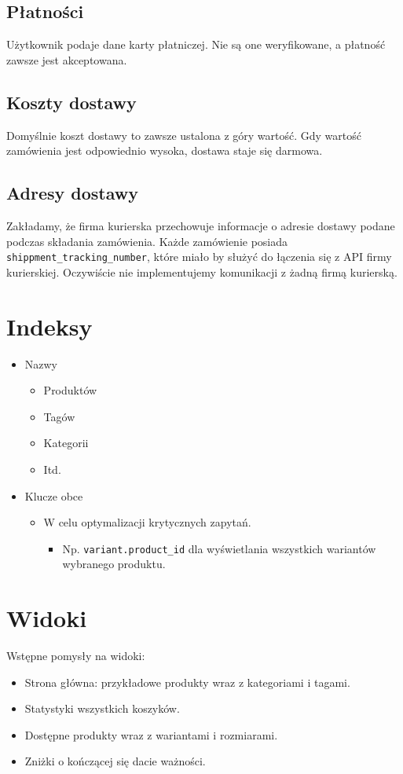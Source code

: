 \subsection*{Płatności}
Użytkownik podaje dane karty płatniczej. Nie są one weryfikowane, a płatność zawsze jest akceptowana.

\subsection*{Koszty dostawy}
Domyślnie koszt dostawy to zawsze ustalona z góry wartość. Gdy wartość zamówienia jest odpowiednio wysoka, dostawa staje się darmowa.

\subsection*{Adresy dostawy}
Zakładamy, że firma kurierska przechowuje informacje o adresie dostawy podane podczas składania zamówienia. Każde zamówienie posiada \texttt{shippment\_tracking\_number}, które miało by służyć do łączenia się z API firmy kurierskiej. Oczywiście nie implementujemy komunikacji z żadną firmą kurierską.

\section*{Indeksy}
\begin{itemize}
    \item Nazwy
        \begin{itemize}
            \item Produktów
            \item Tagów
            \item Kategorii
            \item Itd.
        \end{itemize}
    \item Klucze obce
        \begin{itemize}
            \item W celu optymalizacji krytycznych zapytań.
                    \begin{itemize}
                        \item Np. \texttt{variant.product\_id} dla wyświetlania wszystkich wariantów wybranego produktu.
                    \end{itemize}
        \end{itemize}
\end{itemize}

\section*{Widoki}
Wstępne pomysły na widoki:
\begin{itemize}
    \item Strona główna: przykładowe produkty wraz z kategoriami i tagami.
    \item Statystyki wszystkich koszyków.
    \item Dostępne produkty wraz z wariantami i rozmiarami.
    \item Zniżki o kończącej się dacie ważności.
\end{itemize}


